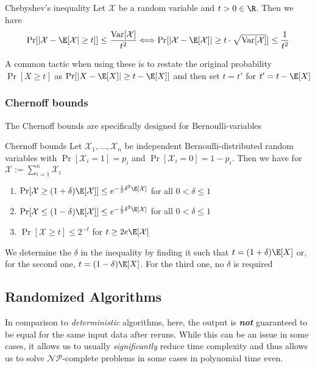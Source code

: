 \begin{theorem}[]{Chebyshev's inequality}
    Let $\mathcal{X}$ be a random variable and $t > 0 \in\R$. Then we have
    \begin{align*}
        \Pr[|\mathcal{X} - \E[\mathcal{X}| \geq t]] \leq \frac{\text{Var}[\mathcal{X}]}{t^2} \Longleftrightarrow \Pr[|\mathcal{X} - \E[\mathcal{X}]| \geq t \cdot \sqrt{\text{Var}[\mathcal{X}]}] \leq \frac{1}{t^2}
    \end{align*}
\end{theorem}

A common tactic when using these is to restate the original probability $\Pr[X \geq t]$ as $\Pr[|X - \E[X]| \geq t - \E[X]]$ and then set $t = t'$ for $t' = t - \E[X]$

\subsubsection{Chernoff bounds}
The Chernoff bounds are specifically designed for Bernoulli-variables
\setcounter{all}{70}
\begin{theorem}[]{Chernoff bounds}
    Let $\mathcal{X}_1, \ldots, \mathcal{X}_n$ be independent Bernoulli-distributed random variables with $\Pr[\mathcal{X}_i = 1] = p_i$ and $\Pr[\mathcal{X}_i = 0] = 1 - p_i$. Then we have for $\mathcal{X} := \sum_{i = 1}^{n} \mathcal{X}_i$
    \begin{enumerate}[label=(\roman*)]
        \item $\Pr[\mathcal{X} \geq (1 + \delta)\E[\mathcal{X}]] \leq e^{-\frac{1}{3}\delta^2\E[\mathcal{X}]}$ \largehspace for all $0 < \delta \leq 1$
        \item $\Pr[\mathcal{X} \leq (1 - \delta)\E[\mathcal{X}]] \leq e^{-\frac{1}{2}\delta^2\E[\mathcal{X}]}$ \largehspace for all $0 < \delta \leq 1$
        \item $\Pr[\mathcal{X} \geq t] \leq 2^{-t}$ \largehspace for $t \geq 2e\E[\mathcal{X}]$
    \end{enumerate}
\end{theorem}
We determine the $\delta$ in the inequality by finding it such that $t = (1 + \delta)\E[X]$ or, for the second one, $t = (1 - \delta)\E[X]$. For the third one, no $\delta$ is required


\newpage
\subsection{Randomized Algorithms}
In comparison to \textit{deterministic} algorithms, here, the output is \textbf{\textit{not}} guaranteed to be equal for the same input data after reruns. 
While this can be an issue in some cases, it allows us to usually \textit{significantly} reduce time complexity and thus allows us to solve $\mathcal{N}\mathcal{P}$-complete problems in some cases in polynomial time even.

